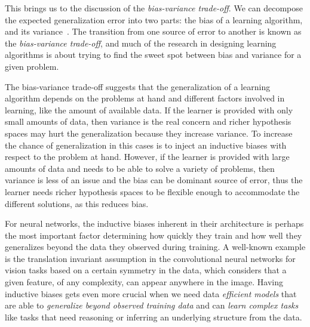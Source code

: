 This brings us to the discussion of the \emph{bias-variance trade-off}.
We can decompose the expected generalization error into two parts: the
bias of a learning algorithm, and its variance~\citep{geman1992neural}. The transition from one source of error to another is known as the \emph{bias-variance trade-off}, and much of the research in designing learning algorithms is about trying to find the sweet spot between bias and variance for a given problem. 

The bias-variance trade-off suggests that the generalization of a learning algorithm depends on the problems at hand and different factors involved in learning, like the amount of available data. 
If the learner is provided with only small amounts of data, then variance is the real concern and richer hypothesis spaces may hurt the generalization because they increase variance.  To increase the chance of generalization in this cases is to inject an inductive biases with respect to the problem at hand.
However, if the learner is provided with large amounts of data and needs to be able to solve a variety of problems, then variance is less of an issue and the bias can be dominant source of error, thus the learner needs richer hypothesis spaces to be flexible enough to accommodate the different solutions, as this reduces bias.

For neural networks, the inductive biases inherent in their architecture is perhaps the most important factor determining how quickly they train and how well they generalizes beyond the data they observed during training. 
A well-known example is the translation invariant assumption in the convolutional neural networks for vision tasks based on a certain symmetry in the data, which considers that a given feature, of any complexity, can appear anywhere in the image.  
Having inductive biases gets even more crucial when we need data \emph{efficient models} that are able to \emph{generalize beyond observed training data} and can \emph{learn complex tasks} like tasks that need reasoning or inferring an underlying structure from the data.

